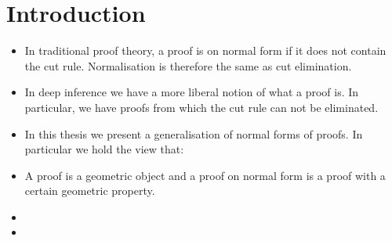 \chapter{Introduction}

\begin{itemize}

\item
In traditional proof theory, a proof is on normal form if it does not contain the cut rule. Normalisation is therefore the same as cut elimination.
\item
In deep inference we have a more liberal notion of what a proof is. In particular, we have proofs from which the cut rule can not be eliminated.
\item
In this thesis we present a generalisation of normal forms of proofs. In particular we hold the view that:
\item
A proof is a geometric object and a proof on normal form is a proof with a certain geometric property.
\item
\item
\end{itemize}